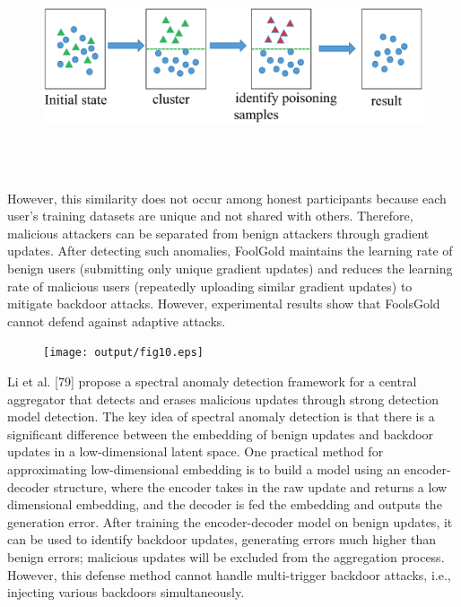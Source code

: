 \begin{figure}[h]
    \centering
    \includegraphics[width=1.0\linewidth,height=2.5in]{output/fig9.eps}
     \caption{}
     \label{fig9}
\end{figure}

However, this similarity does not occur among honest
participants because each user’s training datasets are
unique and not shared with others. Therefore,
malicious attackers can be separated from benign attackers
through gradient updates. After detecting such anomalies,
FoolGold maintains the learning rate of benign users
(submitting only unique gradient updates) and reduces
the learning rate of malicious users (repeatedly uploading
similar gradient updates) to mitigate backdoor attacks.
However, experimental results show that FoolsGold cannot
defend against adaptive attacks.  

\begin{figure}[h]
    \centering
    \texttt{[image: output/fig10.eps]}
     \caption{}
     \label{fig10}
\end{figure}

Li et al. [79] propose a spectral anomaly detection
framework for a central aggregator that detects and
erases malicious updates through strong detection model
detection. The key idea of spectral anomaly detection
is that there is a significant difference between the
embedding of benign updates and backdoor updates in
a low-dimensional latent space. One practical method
for approximating low-dimensional embedding is to build
a model using an encoder-decoder structure, where the
encoder takes in the raw update and returns a low
dimensional embedding, and the decoder is fed the embedding and outputs the generation error.
After training the encoder-decoder model on benign updates, it can
be used to identify backdoor updates, generating errors
much higher than benign errors; malicious updates will
be excluded from the aggregation process. However, this
defense method cannot handle multi-trigger backdoor
attacks, i.e., injecting various backdoors simultaneously.  

